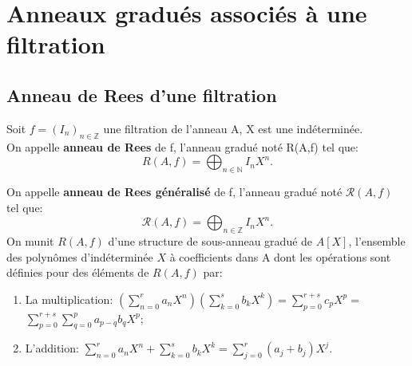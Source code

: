 \section{Anneaux gradués associés à une filtration}
\subsection{Anneau de Rees d'une filtration}
\begin{madefinition}
	Soit $f=(I_n)_{n \in \mathbb{Z}}$ une filtration de l'anneau A, X est une indéterminée.\\
	On appelle \textbf{anneau de Rees} de f, l'anneau gradué noté R(A,f) tel que: 
	\[ R(A,f)  =\displaystyle \bigoplus_{n \in \mathbb{N}}{I_n X^n}.  \]
	
	On appelle \textbf{anneau de Rees généralisé} de f, l'anneau gradué noté $\mathcal{R}(A,f)$ tel que: 
	\[ \mathcal{R}(A,f) = \displaystyle \bigoplus_{n \in \mathbb{Z}}{I_n X^n}.  \]
	On munit $R(A,f)$ d'une structure de sous-anneau gradué de $A[X]$, l'ensemble des polynômes d'indéterminée $X$ à coefficients dans A dont les opérations sont définies pour des éléments de $R(A,f)$ par:
	
	\begin{enumerate}
		\item La multiplication:	$(\sum\limits_{n=0}^{r}a_{n}X^{n})(\sum\limits_{k=0}^{s}b_{k}X^{k})=\sum\limits_{p=0}^{r+s}c_{p}X^{p}=$ $\sum\limits_{p=0}^{r+s}\sum\limits_{q=0}^{p}a_{p-q}b_{q}X^{p}$;
		\item L'addition:   $\sum\limits_{n=0}^{r}a_{n}X^{n}+\sum\limits_{k=0}^{s}b_{k}X^{k}=\sum\limits_{j=0}^{r}(a_{j}+b_{j})X^{j}$.
	\end{enumerate}
\end{madefinition}
